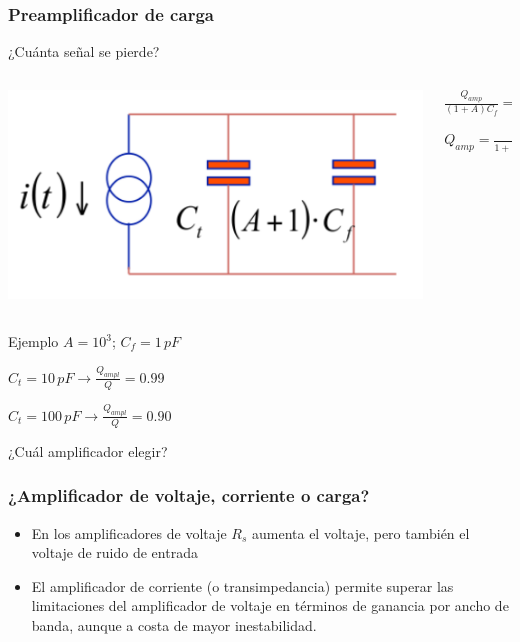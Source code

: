\documentclass{beamer}
\begin{document}
\begin{frame}
\frametitle{Preamplificador de carga}
\begin{block}{¿Cuánta señal se pierde?}
\begin{columns}
\begin{column}{0.5\textwidth}
\includegraphics[width=\textwidth]{d2/charge_preamplifier_signal_loose}
\end{column}
\begin{column}{0.5\textwidth}
\begin{center}
$\frac{Q_{amp}}{(1 + A) C_f} = \frac{Q}{(1 + A)C_f + C_t}$

\vspace{2mm}
\alert{$Q_{amp} = \frac{Q}{1 + \frac{C_t}{(1 + A)C_f}}$}
\end{center}
\end{column}
\end{columns}
\end{block}
\begin{block}{Ejemplo}
$A = 10^3$; $C_f = 1\,pF$

\vspace{2mm}
$C_t = 10\,pF \rightarrow \frac{Q_{ampl}}{Q} = 0.99$

\vspace{2mm}
$C_t = 100\,pF \rightarrow \frac{Q_{ampl}}{Q} = 0.90$
\end{block}
\end{frame}

\begin{frame}
\begin{center}
  {\color{red}\Huge{¿Cuál amplificador elegir?}}
\end{center}
\end{frame}

\begin{frame}
\frametitle{¿Amplificador de voltaje, corriente o carga?}
\begin{block}{}
\begin{itemize}
\item En los amplificadores de voltaje $R_s$ aumenta el voltaje, pero también el
voltaje de ruido de entrada
\item El amplificador de corriente (o transimpedancia) permite superar las
limitaciones del amplificador de voltaje en términos de ganancia por ancho de
banda, aunque a costa de mayor inestabilidad.
\end{itemize}
\end{block}
\end{frame}
\end{document}
